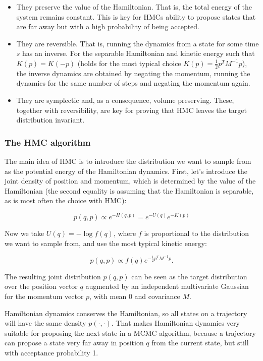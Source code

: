 \documentclass{book}
\theoremstyle{plain}%
\theoremstyle{definition}
\begin{document}
\begin{itemize}
\item They preserve the value of the Hamiltonian. That is, the total energy of the system remains constant. This is key for HMCs ability to propose states that are far away but with a high probability of being accepted.
\item They are reversible. That is, running the dynamics from a state for some time $s$ has an inverse. For the separable Hamiltonian and kinetic energy such that $K(p) = K(-p)$ (holds for the most typical choice $K(p) = \frac{1}{2}p^T M^{-1} p$), the inverse dynamics are obtained by negating the momentum, running the dynamics for the same number of steps and negating the momentum again.
\item They are symplectic and, as a consequence, volume preserving. These, together with reversibility, are key for proving that HMC leaves the target distribution invariant.
\end{itemize}

\subsubsection*{The HMC algorithm}

The main idea of HMC is to introduce the distribution we want to sample from as the potential energy of the Hamiltonian dynamics. First, let's introduce the joint density of position and momentum, which is determined by the value of the Hamiltonian (the second equality is assuming that the Hamiltonian is separable, as is most often the choice with HMC):

$$p(q, p) \propto e^{-H(q, p)} = e^{-U(q)} e^{-K(p)}$$

Now we take $U(q) = -\log f(q)$, where $f$ is proportional to the distribution we want to sample from, and use the most typical kinetic energy:

$$p(q, p) \propto f(q) e^{-\frac{1}{2}p^TM^{-1}p}.$$ 

The resulting joint distribution $p(q, p)$ can be seen as the target distribution over the position vector $q$ augmented by an independent multivariate Gaussian for the momentum vector $p$, with mean 0 and covariance $M$.

Hamiltonian dynamics conserves the Hamiltonian, so all states on a trajectory will have the same density $p(\cdot, \cdot)$. That makes Hamiltonian dynamics very suitable for proposing the next state in a MCMC algorithm, because a trajectory can propose a state very far away in position $q$ from the current state, but still with acceptance probability 1.
\end{document}
